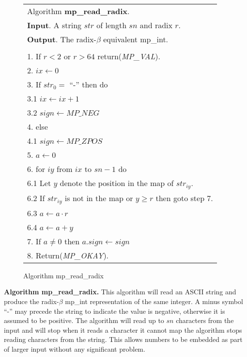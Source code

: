 \documentclass[b5paper]{book}
\begin{document}
\newpage\begin{figure}[!here]
\begin{small}
\begin{center}
\begin{tabular}{l}
\hline Algorithm \textbf{mp\_read\_radix}. \\
\textbf{Input}.   A string $str$ of length $sn$ and radix $r$. \\
\textbf{Output}.  The radix-$\beta$ equivalent mp\_int. \\
\hline \\
1.  If $r < 2$ or $r > 64$ return(\textit{MP\_VAL}). \\
2.  $ix \leftarrow 0$ \\
3.  If $str_0 =$ ``-'' then do \\
\hspace{3mm}3.1  $ix \leftarrow ix + 1$ \\
\hspace{3mm}3.2  $sign \leftarrow MP\_NEG$ \\
4.  else \\
\hspace{3mm}4.1  $sign \leftarrow MP\_ZPOS$ \\
5.  $a \leftarrow 0$ \\
6.  for $iy$ from $ix$ to $sn - 1$ do \\
\hspace{3mm}6.1  Let $y$ denote the position in the map of $str_{iy}$. \\
\hspace{3mm}6.2  If $str_{iy}$ is not in the map or $y \ge r$ then goto step 7. \\
\hspace{3mm}6.3  $a \leftarrow a \cdot r$ \\
\hspace{3mm}6.4  $a \leftarrow a + y$ \\
7.  If $a \ne 0$ then $a.sign \leftarrow sign$ \\
8.  Return(\textit{MP\_OKAY}). \\
\hline
\end{tabular}
\end{center}
\end{small}
\caption{Algorithm mp\_read\_radix}
\end{figure}
\textbf{Algorithm mp\_read\_radix.}
This algorithm will read an ASCII string and produce the radix-$\beta$ mp\_int representation of the same integer.  A minus symbol ``-'' may precede the 
string  to indicate the value is negative, otherwise it is assumed to be positive.  The algorithm will read up to $sn$ characters from the input
and will stop when it reads a character it cannot map the algorithm stops reading characters from the string.  This allows numbers to be embedded
as part of larger input without any significant problem.
\end{document}
